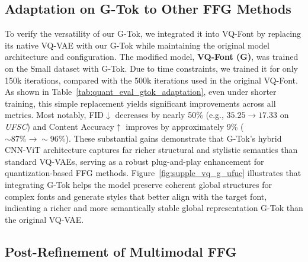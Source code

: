 \subsection{Adaptation on G-Tok to Other FFG Methods}
\label{ssec:quantitiative_G-Tok_plugin}
To verify the versatility of our G-Tok, we integrated it into VQ-Font by replacing its native VQ-VAE with our G-Tok while maintaining the original model architecture and configuration. The modified model, \textbf{VQ-Font (G)}, was trained on the Small dataset with G-Tok. Due to time constraints, we trained it for only 150k iterations, compared with the 500k iterations used in the original VQ-Font. As shown in Table~\ref{tab:quant_eval_gtok_adaptation}, even under shorter training, this simple replacement yields significant improvements across all metrics. Most notably, FID$\downarrow$ decreases by nearly 50\% (e.g., $35.25 \to 17.33$ on \textit{UFSC}) and Content Accuracy$\uparrow$ improves by approximately 9\% ($\sim87\% \to \sim96\%$). These substantial gains demonstrate that G-Tok's hybrid CNN-ViT architecture captures far richer structural and stylistic semantics than standard VQ-VAEs, serving as a robust plug-and-play enhancement for quantization-based FFG methods. Figure~\ref{fig:supple_vq_g_ufuc} illustrates that integrating G-Tok helps the model preserve coherent global structures for complex fonts and generate styles that better align with the target font, indicating a richer and more semantically stable global representation G-Tok than the original VQ-VAE.


\subsection{Post-Refinement of Multimodal FFG}
\label{ssec:mm_post_refinement}

